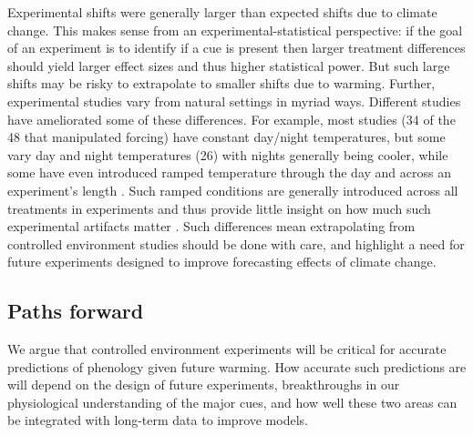 \documentclass[11pt,letter]{article}
\begin{document}
Experimental shifts were generally larger than expected shifts due to climate change. This makes sense from an experimental-statistical perspective: if the goal of an experiment is to identify if a cue is present then larger treatment differences should yield larger effect sizes and thus higher statistical power. But such large shifts may be risky to extrapolate to smaller shifts due to warming. Further, experimental studies vary from natural settings in myriad ways. Different studies have ameliorated some of these differences. For example, most studies (34 of the 48 that manipulated forcing) have constant day/night temperatures, but some vary day and night temperatures (26) with nights generally being cooler, while some have even introduced ramped temperature through the day and across an experiment's length \citep[e.g.,][]{Basler:2012,Laube:2014a}. Such ramped conditions are generally introduced across all treatments in experiments and thus provide little insight on how much such experimental artifacts matter \citep[but see][]{erwin1995}. Such differences mean extrapolating from controlled environment studies should be done with care, and highlight a need for future experiments designed to improve forecasting effects of climate change. 

\subsection{Paths forward} %
We argue that controlled environment experiments will be critical for accurate predictions of phenology given future warming. How accurate such predictions are will depend on the design of future experiments, breakthroughs in our physiological understanding of the major cues, and how well these two areas can be integrated with long-term data to improve models. 
\end{document}

